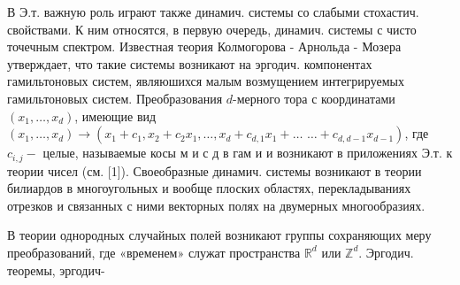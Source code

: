 \documentclass[10pt]{article}
\begin{document}
В Э.т. важную роль играют также динамич. системы со слабыми стохастич. свойствами. К ним относятся, в первую очередь, динамич. системы с чисто точечным спектром. Известная теория Колмогорова - Арнольда - Мозера утверждает, что такие системы возникают на эргодич. компонентах гамильтоновых систем, являюшихся малым возмущением интегрируемых гамильтоновых систем. Преобразования $d$-мерного тора с координатами $\left(x_{1}, \ldots, x_{d}\right)$, имеющие вид $\left(x_{1}, \ldots, x_{d}\right) \rightarrow\left(x_{1}+c_{1}, x_{2}+c_{2} x_{1}, \ldots, x_{d}+c_{d, 1} x_{1}+\ldots\right.$ $\left.\ldots+c_{d, d-1} x_{d-1}\right)$, где $c_{i, j}-$ целые, называемые косы м и с д в гам и и возникают в приложениях Э.т. к теории чисел (см. [1]). Своеобразные динамич. системы возникают в теории билиардов в многоугольных и вообще плоских областях, перекладываниях отрезков и связанных с ними векторных полях на двумерных многообразиях.



В теории однородных случайных полей возникают группы сохраняющих меру преобразований, где «временем» служат пространства $\mathbb{R}^{d}$ или $\mathbb{Z}^{d}$. Эргодич. теоремы, эргодич-
\end{document}
